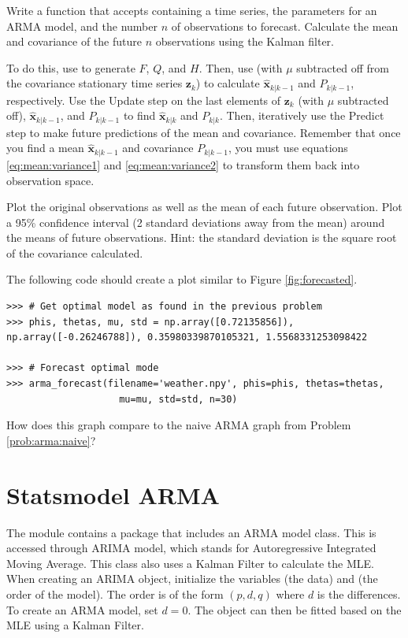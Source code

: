 \begin{problem}
\label{prob:arma:forecast}
Write a function  that accepts  containing a time series, the parameters for an ARMA model, and the number $n$ of observations to forecast.
Calculate the mean and covariance of the future $n$ observations using the Kalman filter.

To do this, use  to generate $F$, $Q$, and $H$.
Then, use  (with $\mu$ subtracted off from the covariance stationary time series $\mathbf{z}_k$) to calculate $\hat{\mathbf{x}}_{k|k-1}$ and $P_{k|k-1}$, respectively.
Use the Update step on the last elements of $\mathbf{z}_k$ (with $\mu$ subtracted off), $\hat{\mathbf{x}}_{k|k-1}$, and $P_{k|k-1}$ to find $\hat{\mathbf{x}}_{k|k}$ and $P_{k|k}$.
Then, iteratively use the Predict step to make future predictions of the mean and covariance.
Remember that once you find a mean $\hat{\mathbf{x}}_{k|k-1}$ and covariance $P_{k|k-1}$, you must use equations \ref{eq:mean:variance1} and \ref{eq:mean:variance2} to transform them back into observation space.

Plot the original observations as well as the mean of each future observation.
Plot a 95\% confidence interval (2 standard deviations away from the mean) around the means of future observations.
Hint: the standard deviation is the square root of the covariance calculated.

The following code should create a plot similar to Figure \ref{fig:forecasted}.

\begin{lstlisting}
>>> # Get optimal model as found in the previous problem
>>> phis, thetas, mu, std = np.array([0.72135856]), np.array([-0.26246788]), 0.35980339870105321, 1.5568331253098422

>>> # Forecast optimal mode
>>> arma_forecast(filename='weather.npy', phis=phis, thetas=thetas, 
                    mu=mu, std=std, n=30)
\end{lstlisting}

\noindent How does this graph compare to the naive ARMA graph from Problem \ref{prob:arma:naive}?
\end{problem}

\section*{Statsmodel ARMA}

The module  contains a package that includes an ARMA model class.
This is accessed through ARIMA model, which stands for Autoregressive Integrated Moving Average.
This class also uses a Kalman Filter to calculate the MLE.
When creating an ARIMA object, initialize the variables  (the data) and  (the order of the model).
The order is of the form $(p,d,q)$ where $d$ is the differences.
To create an ARMA model, set $d=0$.
The object can then be fitted based on the MLE using a Kalman Filter.

